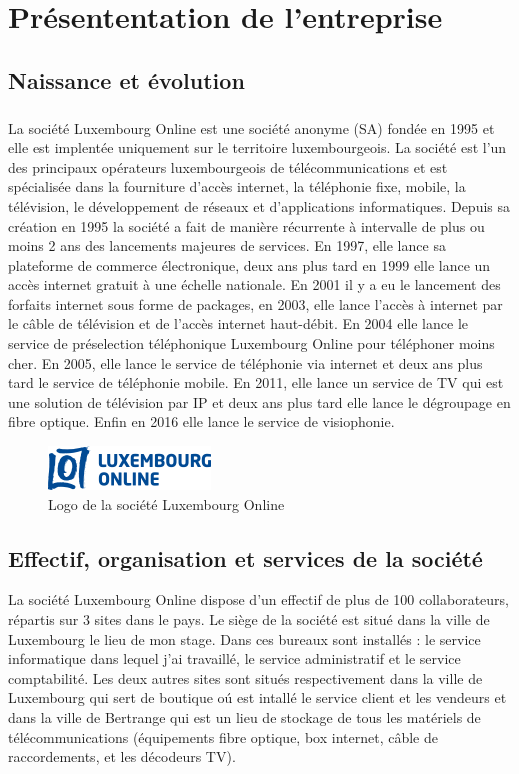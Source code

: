 \chapter{Présententation de l'entreprise}
\section{Naissance et évolution}
\paragraph*{}
La société Luxembourg Online est une société anonyme (SA) fondée en 1995 et elle est implentée uniquement sur le territoire luxembourgeois. La société est l'un des principaux opérateurs luxembourgeois de télécommunications et est spécialisée dans la fourniture d'accès internet, la téléphonie fixe, mobile, la télévision, le développement de réseaux et d'applications informatiques. Depuis sa création en 1995 la société a fait de manière récurrente à intervalle de plus ou moins 2 ans des lancements majeures de services.  En 1997, elle lance sa plateforme de commerce électronique, deux ans plus tard en 1999 elle lance un accès internet gratuit à une échelle nationale. En 2001 il y a eu le lancement des forfaits internet sous forme de packages, en 2003, elle lance l'accès à internet par le câble de télévision et de l'accès internet haut-débit. En 2004 elle lance le service de préselection téléphonique Luxembourg Online pour téléphoner moins cher. En 2005, elle lance le service de téléphonie via internet et deux ans plus tard le service de téléphonie mobile. En 2011, elle lance un service de TV qui est une solution de télévision par IP et deux ans plus tard elle lance le dégroupage en fibre optique. Enfin en 2016 elle lance le service de visiophonie.

\begin{figure}[H]
	\centering
	\includegraphics[scale=1]{assets/images/Logo-LOL.png}
	\caption{Logo de la société Luxembourg Online}
	\label{fig.1}
\end{figure} 

\section{Effectif, organisation et services de la société}
La société Luxembourg Online dispose d'un effectif de plus de 100 collaborateurs, répartis sur 3 sites dans le pays. Le siège de la société est situé dans la ville de Luxembourg le lieu de mon stage. Dans ces bureaux sont installés : le service informatique dans lequel j'ai travaillé, le service administratif et le service comptabilité. Les deux autres sites sont situés respectivement dans la ville de Luxembourg qui sert de boutique oú est intallé le service client et les vendeurs et dans la ville de Bertrange qui est un lieu de stockage de tous les matériels de télécommunications (équipements fibre optique, box internet, câble de raccordements, et les décodeurs TV).
